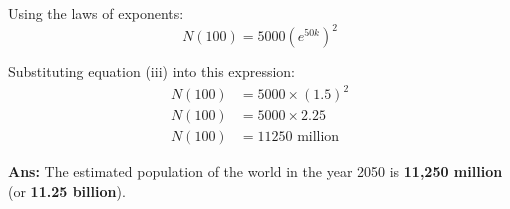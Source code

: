 Using the laws of exponents:
\begin{equation*}
    N(100) = 5000 \left(e^{50k}\right)^2
\end{equation*}

Substituting equation (iii) into this expression:
\begin{align*}
    N(100) &= 5000 \times (1.5)^2 \\[1ex]
    N(100) &= 5000 \times 2.25 \\[1ex]
    N(100) &= 11250 \text{ million}
\end{align*}

\textbf{Ans:} The estimated population of the world in the year 2050 is \textbf{11,250 million} (or \textbf{11.25 billion}).
